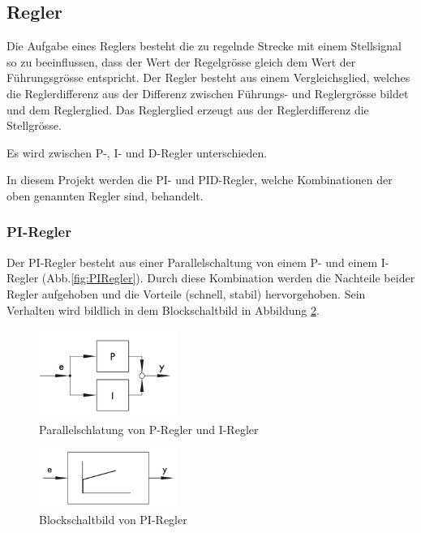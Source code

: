 \subsection{Regler}
Die  Aufgabe  eines  Reglers  besteht   die  zu  regelnde  Strecke  mit  einem
Stellsignal  so  zu  beeinflussen,  dass der  Wert  der  Regelgr\"osse  gleich
dem  Wert  der F\"uhrungsgr\"osse  entspricht. Der  Regler  besteht aus  einem
Vergleichsglied,  welches  die  Reglerdifferenz  aus  der  Differenz  zwischen
F\"uhrungs-  und Reglergr\"osse  bildet und  dem Reglerglied. Das  Reglerglied
erzeugt aus der Reglerdifferenz die Stellgr\"osse.

Es wird zwischen P-, I- und D-Regler unterschieden.

In diesem Projekt werden die PI- und PID-Regler, welche Kombinationen der oben
genannten Regler sind, behandelt.

\subsubsection{PI-Regler}
Der  PI-Regler   besteht  aus  einer   Parallelschaltung  von  einem   P-  und
einem  I-Regler (Abb.\ref{fig:PIRegler}). Durch  diese Kombination  werden die
Nachteile  beider  Regler  aufgehoben   und  die  Vorteile  (schnell,  stabil)
hervorgehoben. Sein  Verhalten   wird  bildlich  in  dem   Blockschaltbild  in
Abbildung \ref{fig:PIRegler2}.

\begin{figure}[h!, width=\pagewidth]
    \begin{center}
    \includegraphics[width=0.4\textwidth]{images/PIRegler1}
    \caption{Parallelschlatung von P-Regler und I-Regler}
    \label{fig:PIRegler1}
    \end{center}
\end{figure}

\begin{figure}[h!, width=\pagewidth]
    \begin{center}
    \includegraphics[width=0.4\textwidth]{images/PIRegler2}
    \caption{Blockschaltbild von PI-Regler}
    \label{fig:PIRegler2}
    \end{center}
\end{figure}


